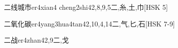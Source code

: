 \begin{EntryWithPhonetic}{二线城市}{er4xian4 cheng2shi4}{2,8,9,5}{⼆,⽷,⼟,⼱}[HSK 5]
\end{EntryWithPhonetic}

\begin{EntryWithPhonetic}{二氧化碳}{er4yang3hua4tan4}{2,10,4,14}{⼆,⽓,⼔,⽯}[HSK 7-9]
\end{EntryWithPhonetic}

\begin{EntryWithPhonetic}{二战}{er4zhan4}{2,9}{⼆,⼽}
\end{EntryWithPhonetic}


